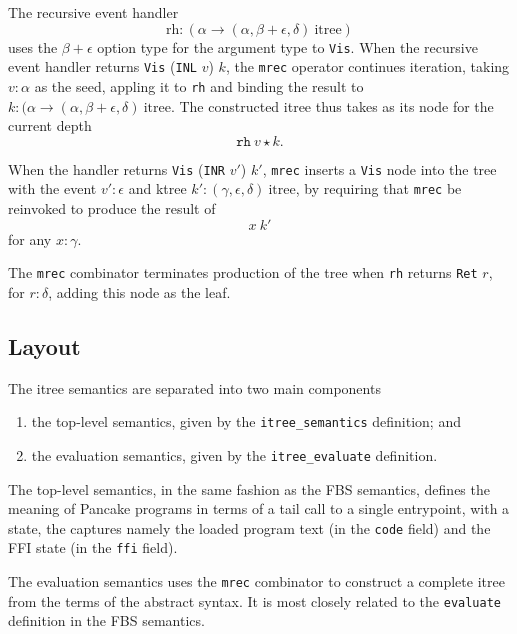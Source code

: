 \documentclass[12pt,a4paper]{report}
\begin{document}
The recursive event handler
\begin{equation*}
  \text{rh} : (\alpha \to (\alpha, \beta + \epsilon, \delta)\ \text{itree})
\end{equation*}
uses the $\beta + \epsilon$ option type for the argument type to \texttt{Vis}. When the recursive event handler returns \texttt{Vis} (\texttt{INL} $v$) $k$, the \texttt{mrec} operator continues iteration, taking $v:\alpha$ as the seed, appling it to \texttt{rh} and binding the result to $k:(\alpha \to (\alpha, \beta + \epsilon, \delta)\ \text{itree}$. The constructed itree thus takes as its node for the current depth
\begin{equation*}
  \texttt{rh}\ v \star k.
\end{equation*}

When the handler returns \texttt{Vis} (\texttt{INR} $v'$) $k'$, \texttt{mrec} inserts a \texttt{Vis} node into the tree with the event $v':\epsilon$ and ktree $k':(\gamma, \epsilon, \delta)\ \text{itree}$, by requiring that \texttt{mrec} be reinvoked to produce the result of
\begin{equation*}
  x\ k'
\end{equation*}
for any $x:\gamma$.

The \texttt{mrec} combinator terminates production of the tree when \texttt{rh} returns \texttt{Ret} $r$, for $r:\delta$, adding this node as the leaf.

\subsection{Layout}
\label{sec:layout-1}

The itree semantics are separated into two main components
\begin{enumerate}
  \item the top-level semantics, given by the \texttt{itree\_semantics} definition; and
  \item the evaluation semantics, given by the \texttt{itree\_evaluate} definition.
\end{enumerate}

The top-level semantics, in the same fashion as the FBS semantics, defines the meaning of Pancake programs in terms of a tail call to a single entrypoint, with a state, the captures namely the loaded program text (in the \texttt{code} field) and the FFI state (in the \texttt{ffi} field).

The evaluation semantics uses the \texttt{mrec} combinator to construct a complete itree from the terms of the abstract syntax. It is most closely related to the \texttt{evaluate} definition in the FBS semantics.
\end{document}
